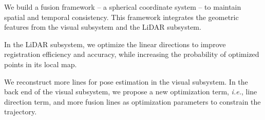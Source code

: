 \begin{compactitem}
\item We build a fusion framework -- a spherical coordinate system -- to maintain spatial and temporal consistency. This framework integrates the geometric features from the visual subsystem and the LiDAR subsystem.

\item In the LiDAR subsystem, we optimize the linear directions to improve registration efficiency and accuracy, while increasing the probability of optimized points in its local map.

\item We reconstruct more lines for pose estimation in the visual subsystem. In the back end of the visual subsystem, we propose a new optimization term, \textit{i.e.}, line direction term, and more fusion lines as optimization parameters to constrain the trajectory.

\end{compactitem}
